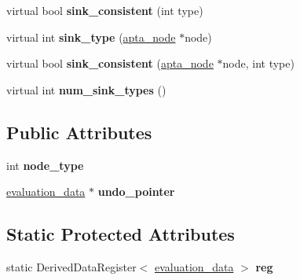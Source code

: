 \begin{DoxyCompactItemize}
\item 
virtual bool {\bfseries sink\+\_\+consistent} (int type)\hypertarget{classevaluation__data_ad3045eb73b3d82d657e808aa33848722}{}\label{classevaluation__data_ad3045eb73b3d82d657e808aa33848722}

\item 
virtual int {\bfseries sink\+\_\+type} (\hyperlink{classapta__node}{apta\+\_\+node} $\ast$node)\hypertarget{classevaluation__data_a185bc8febf0cf0a8bd0a967e911c523c}{}\label{classevaluation__data_a185bc8febf0cf0a8bd0a967e911c523c}

\item 
virtual bool {\bfseries sink\+\_\+consistent} (\hyperlink{classapta__node}{apta\+\_\+node} $\ast$node, int type)\hypertarget{classevaluation__data_abb8607435f006cb15269f252cd18b9da}{}\label{classevaluation__data_abb8607435f006cb15269f252cd18b9da}

\item 
virtual int {\bfseries num\+\_\+sink\+\_\+types} ()\hypertarget{classevaluation__data_ac863fd6a529ba41a87bdeac91cb981fb}{}\label{classevaluation__data_ac863fd6a529ba41a87bdeac91cb981fb}

\end{DoxyCompactItemize}
\subsection*{Public Attributes}
\begin{DoxyCompactItemize}
\item 
int {\bfseries node\+\_\+type}\hypertarget{classevaluation__data_aa0838506c61ba0400cde7cb71bbcf449}{}\label{classevaluation__data_aa0838506c61ba0400cde7cb71bbcf449}

\item 
\hyperlink{classevaluation__data}{evaluation\+\_\+data} $\ast$ {\bfseries undo\+\_\+pointer}\hypertarget{classevaluation__data_a7c72d32aa4dbab4b03838bff5daa7b01}{}\label{classevaluation__data_a7c72d32aa4dbab4b03838bff5daa7b01}

\end{DoxyCompactItemize}
\subsection*{Static Protected Attributes}
\begin{DoxyCompactItemize}
\item 
static Derived\+Data\+Register$<$ \hyperlink{classevaluation__data}{evaluation\+\_\+data} $>$ {\bfseries reg}\hypertarget{classevaluation__data_aab122a205d97fd47be8f59e49804e6de}{}\label{classevaluation__data_aab122a205d97fd47be8f59e49804e6de}

\end{DoxyCompactItemize}


